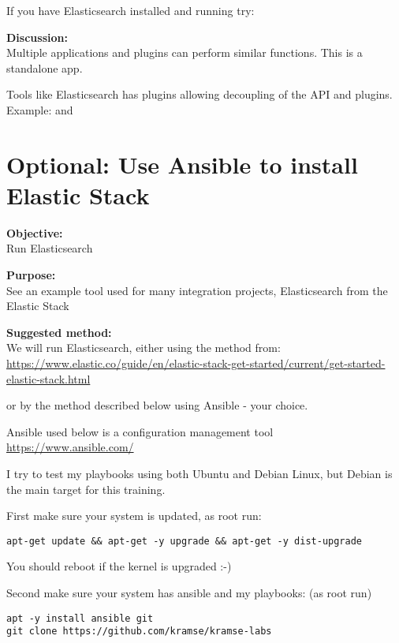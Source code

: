 \documentclass[a4paper,11pt,notitlepage]{report}
\begin{document}
If you have Elasticsearch installed and running try: 

{\bf Discussion:}\\
Multiple applications and plugins can perform similar functions. This is a standalone app.

Tools like Elasticsearch has plugins allowing decoupling of the API and plugins. Example:  and 



\chapter{Optional: Use Ansible to install Elastic Stack}
\label{ex:basicansible}


{\bf Objective:}\\
Run Elasticsearch

{\bf Purpose:}\\
See an example tool used for many integration projects, Elasticsearch from the Elastic Stack

{\bf Suggested method:}\\
We will run Elasticsearch, either using the method from:\\{\footnotesize
\url{https://www.elastic.co/guide/en/elastic-stack-get-started/current/get-started-elastic-stack.html}}

or by the method described below using Ansible - your choice.

Ansible used below is a configuration management tool \url{https://www.ansible.com/}

I try to test my playbooks using both Ubuntu and Debian Linux, but Debian is the main target for this training.

First make sure your system is updated, as root run:

\begin{verbatim}
apt-get update && apt-get -y upgrade && apt-get -y dist-upgrade
\end{verbatim}

You should reboot if the kernel is upgraded :-)

Second make sure your system has ansible and my playbooks: (as root run)
\begin{verbatim}
apt -y install ansible git
git clone https://github.com/kramse/kramse-labs
\end{verbatim}
\end{document}
